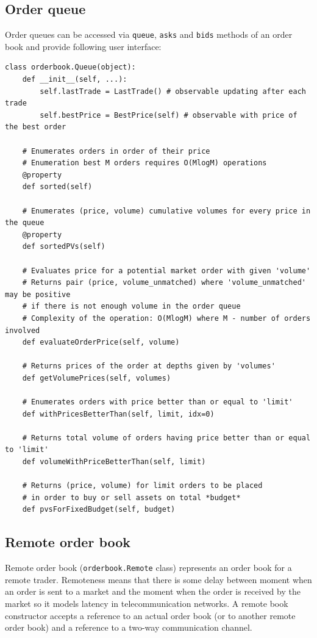 \documentclass[a4paper,11pt]{article}
\begin{document}
\subsection{Order queue}\label{order-queue}

Order queues can be accessed via \texttt{queue}, \texttt{asks} and
\texttt{bids} methods of an order book and provide following user
interface:

\begin{verbatim}
class orderbook.Queue(object):
    def __init__(self, ...):
        self.lastTrade = LastTrade() # observable updating after each trade
        self.bestPrice = BestPrice(self) # observable with price of the best order

    # Enumerates orders in order of their price
    # Enumeration best M orders requires O(MlogM) operations
    @property
    def sorted(self)

    # Enumerates (price, volume) cumulative volumes for every price in the queue
    @property
    def sortedPVs(self)

    # Evaluates price for a potential market order with given 'volume'
    # Returns pair (price, volume_unmatched) where 'volume_unmatched' may be positive
    # if there is not enough volume in the order queue
    # Complexity of the operation: O(MlogM) where M - number of orders involved
    def evaluateOrderPrice(self, volume)

    # Returns prices of the order at depths given by 'volumes'
    def getVolumePrices(self, volumes)

    # Enumerates orders with price better than or equal to 'limit'
    def withPricesBetterThan(self, limit, idx=0)

    # Returns total volume of orders having price better than or equal to 'limit'
    def volumeWithPriceBetterThan(self, limit)

    # Returns (price, volume) for limit orders to be placed
    # in order to buy or sell assets on total *budget*
    def pvsForFixedBudget(self, budget)
\end{verbatim}

\subsection{Remote order book}\label{remote-order-book}

Remote order book (\texttt{orderbook.Remote} class) represents an order
book for a remote trader. Remoteness means that there is some delay
between moment when an order is sent to a market and the moment when the
order is received by the market so it models latency in
telecommunication networks. A remote book constructor accepts a
reference to an actual order book (or to another remote order book) and
a reference to a two-way communication channel.
\end{document}

